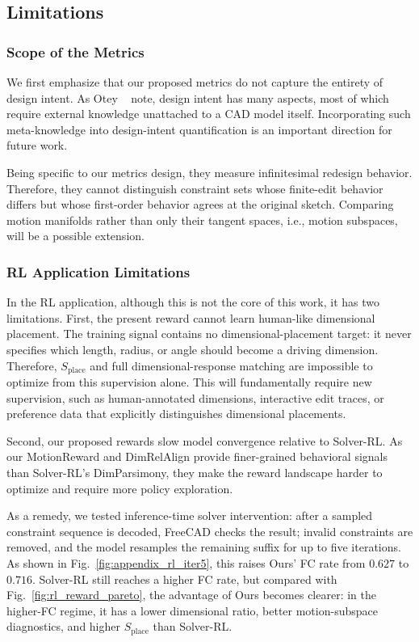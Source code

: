 \subsection{Limitations}
\label{sec:appendix_limitations}

\subsubsection{Scope of the Metrics}
We first emphasize that our proposed metrics do not capture the entirety of design intent. As Otey \etal~\cite{otey2018revisiting} note, design intent has many aspects, most of which require external knowledge unattached to a CAD model itself. Incorporating such meta-knowledge into design-intent quantification is an important direction for future work.

Being specific to our metrics design, they measure infinitesimal redesign behavior. Therefore, they cannot distinguish constraint sets whose finite-edit behavior differs but whose first-order behavior agrees at the original sketch. Comparing motion manifolds rather than only their tangent spaces, i.e., motion subspaces, will be a possible extension.

\subsubsection{RL Application Limitations}

In the RL application, although this is not the core of this work, it has two limitations. First, the present reward cannot learn human-like dimensional placement. The training signal contains no dimensional-placement target: it never specifies which length, radius, or angle should become a driving dimension. Therefore, $S_{\mathrm{place}}$ and full dimensional-response matching are impossible to optimize from this supervision alone. This will fundamentally require new supervision, such as human-annotated dimensions, interactive edit traces, or preference data that explicitly distinguishes dimensional placements.

Second, our proposed rewards slow model convergence relative to Solver-RL. As our MotionReward and DimRelAlign provide finer-grained behavioral signals than Solver-RL's DimParsimony, they make the reward landscape harder to optimize and require more policy exploration.

As a remedy, we tested inference-time solver intervention: after a sampled constraint sequence is decoded, FreeCAD checks the result; invalid constraints are removed, and the model resamples the remaining suffix for up to five iterations. As shown in Fig.~\ref{fig:appendix_rl_iter5}, this raises Ours' FC rate from $0.627$ to $0.716$. Solver-RL still reaches a higher FC rate, but compared with Fig.~\ref{fig:rl_reward_pareto}, the advantage of Ours becomes clearer: in the higher-FC regime, it has a lower dimensional ratio, better motion-subspace diagnostics, and higher $S_{\mathrm{place}}$ than Solver-RL.

